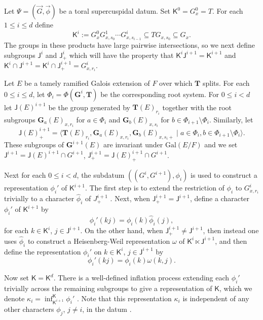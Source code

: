 \documentclass[12pt]{amsart}
\newcommand{\ratk}{F}
\newcommand{\extk}{E}
\newcommand{\Gal}{\mathrm{Gal}}
\newcommand{\GG}{\mathbf{G}} %
\newcommand{\TT}{\mathbf{T}} %
\newcommand{\KT}{\mathsf{K}}
\newcommand{\J}{\mathsf{J}}
\theoremstyle{plain}
\theoremstyle{definition}
\theoremstyle{remark}
\numberwithin{equation}{section}
\numberwithin{figure}{section}
\begin{document}
Let $\Psi = (\vec{G},\vec{\phi})$ be a toral supercuspidal datum.  Set $\KT^0=G^0_x=T$.  For each $1\leq i\leq d$ define  
$$
\KT^i:= G^0_{x}G^1_{x,s_0}\cdots G^{i}_{x,s_{i-1}} 
\subseteq TG_{x,s_0} \subseteq G_x.
$$
The groups in these products have large pairwise intersections, so we next define subgroups $\J^i$ and $\J^i_+$ which will have the property that $\KT^i\J^{i+1}=\KT^{i+1}$ and $\KT^i\cap \J^{i+1} = \KT^i\cap \J^{i+1}_+ = G^i_{x,r_i}$. 

Let $\extk$ be a tamely ramified Galois extension of $\ratk$ over which $\TT$ splits.  For each $0\leq i\leq d$, let $\Phi_i = \Phi(\GG^i,\TT)$ be the corresponding root system.   For $0 \leq i < d$ let $\J(\extk)^{i+1}$ be the group generated by $\TT(\extk)_{r_{i}}$ together with the root subgroups  
$\GG_a(\extk)_{x,r_{i}}$ for $a\in \Phi_{i}$ and $\GG_b(\extk)_{x,s_{i}}$ for $b\in \Phi_{i+1}\setminus \Phi_{i}$.  Similarly, let
$$
\J(\extk)^{i+1}_+ = \langle \TT(\extk)_{r_{i}}, \GG_a(\extk)_{x,r_{i}}, \GG_b(\extk)_{x,s_{i}+} \mid a\in \Phi_{i}, b\in \Phi_{i+1}\setminus \Phi_{i}  \rangle.
$$
 These subgroups of $\GG^{i+1}(\extk)$ are invariant under $\Gal(\extk/\ratk)$ and we set
$\J^{i+1}=\J(E)^{i+1}\cap G^{i+1}$, $\J^{i+1}_+ = \J(\extk)^{i+1}_+\cap G^{i+1}$.


Next for each $0\leq i <d$, the subdatum $((G^i,G^{i+1}), \phi_i)$ is used to construct a representation $\phi_i'$ of $\KT^{i+1}$.  The first step is to extend the restriction of $\phi_i$ to $G^i_{x,r_i}$ trivially to a character $\hat\phi_i$ of  $J^{i+1}_+$ \cite[\S4]{Yu2001}.
 Next, when $\J^{i+1}_+=\J^{i+1}$, define a character $\phi_i'$ of $\KT^{i+1}$ by 
\begin{equation}\label{E:phi'1}
\phi_i'(kj)=\phi_i(k)\hat\phi_i(j),
\end{equation}
for each $k\in \KT^i$, $j\in \J^{i+1}$.
 On the other hand, when $\J^{i+1}_+ \neq \J^{i+1}$, then instead one uses $\hat\phi_i$ 
 to construct a Heisenberg-Weil representation $\omega$ of $\KT^i\ltimes \J^{i+1}$, and then define the representation $\phi_i'$ on $k\in \KT^i$, $j\in \J^{i+1}$ by
\begin{equation}\label{E:phi'2}
\phi_i'(kj) = \phi_i(k)\omega(k,j).
\end{equation}

Now set $\KT = \KT^d$.  There is a well-defined inflation process extending each $\phi_i'$ trivially across the remaining subgroups to give a representation of $\KT$, which we denote $\kappa_i=\inf_{\KT^{i+1}}^{\KT}\phi_i'$  \cite[\S3.4]{HakimMurnaghan2008}. Note that this representation $\kappa_i$ is independent of any other characters $\phi_j$, $j\neq i$, in the datum \cite[Proposition 3.26]{HakimMurnaghan2008}.
\end{document}
